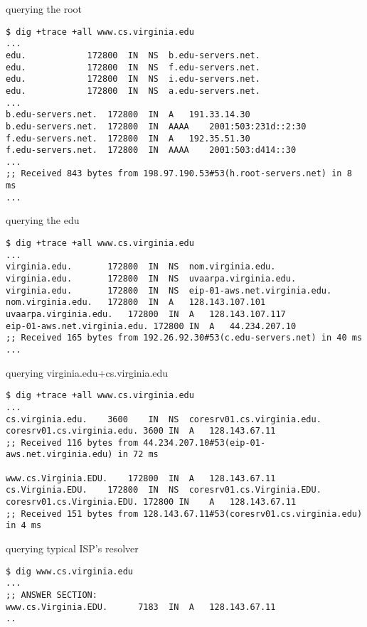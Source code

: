 
\begin{frame}[fragile]{querying the root}
\begin{Verbatim}[fontsize=\scriptsize]
$ dig +trace +all www.cs.virginia.edu
...
edu.			172800	IN	NS	b.edu-servers.net.
edu.			172800	IN	NS	f.edu-servers.net.
edu.			172800	IN	NS	i.edu-servers.net.
edu.			172800	IN	NS	a.edu-servers.net.
...
b.edu-servers.net.	172800	IN	A	191.33.14.30
b.edu-servers.net.	172800	IN	AAAA	2001:503:231d::2:30
f.edu-servers.net.	172800	IN	A	192.35.51.30
f.edu-servers.net.	172800	IN	AAAA	2001:503:d414::30
...
;; Received 843 bytes from 198.97.190.53#53(h.root-servers.net) in 8 ms
...
\end{Verbatim}
\end{frame}

\begin{frame}[fragile]{querying the edu}
\begin{Verbatim}[fontsize=\scriptsize]
$ dig +trace +all www.cs.virginia.edu
...
virginia.edu.		172800	IN	NS	nom.virginia.edu.
virginia.edu.		172800	IN	NS	uvaarpa.virginia.edu.
virginia.edu.		172800	IN	NS	eip-01-aws.net.virginia.edu.
nom.virginia.edu.	172800	IN	A	128.143.107.101
uvaarpa.virginia.edu.	172800	IN	A	128.143.107.117
eip-01-aws.net.virginia.edu. 172800 IN	A	44.234.207.10
;; Received 165 bytes from 192.26.92.30#53(c.edu-servers.net) in 40 ms
...
\end{Verbatim}
\end{frame}
\begin{frame}[fragile]{querying virginia.edu+cs.virginia.edu}
\begin{Verbatim}[fontsize=\scriptsize]
$ dig +trace +all www.cs.virginia.edu
...
cs.virginia.edu.	3600	IN	NS	coresrv01.cs.virginia.edu.
coresrv01.cs.virginia.edu. 3600	IN	A	128.143.67.11
;; Received 116 bytes from 44.234.207.10#53(eip-01-aws.net.virginia.edu) in 72 ms

www.cs.Virginia.EDU.	172800	IN	A	128.143.67.11
cs.Virginia.EDU.	172800	IN	NS	coresrv01.cs.Virginia.EDU.
coresrv01.cs.Virginia.EDU. 172800 IN	A	128.143.67.11
;; Received 151 bytes from 128.143.67.11#53(coresrv01.cs.virginia.edu) in 4 ms
\end{Verbatim}
\end{frame}

\begin{frame}[fragile]{querying typical ISP's resolver}
\begin{Verbatim}[fontsize=\scriptsize]
$ dig www.cs.virginia.edu
...
;; ANSWER SECTION:
www.cs.Virginia.EDU.	  7183	IN	A	128.143.67.11
..
\end{Verbatim}
\end{frame}
